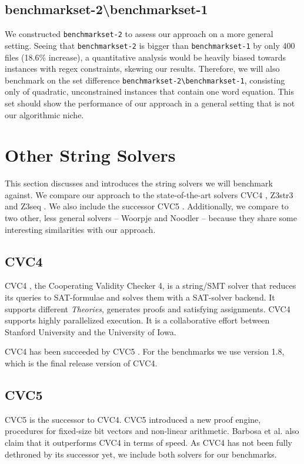 \subsection{benchmarkset-2\:\textbackslash\:benchmarkset-1}
We constructed \texttt{benchmarkset-2} to assess our approach on a more general setting. Seeing that \texttt{benchmarkset-2} is bigger than \texttt{benchmarkset-1} by only 400 files (18.6\% increase), a quantitative analysis would be heavily biased towards instances with regex constraints, skewing our results. Therefore, we will also benchmark on the set difference \texttt{benchmarkset-2\:\textbackslash\:benchmarkset-1}, consisting only of quadratic, unconstrained instances that contain one word equation. This set should show the performance of our approach in a general setting that is not our algorithmic niche.

\newpage

\section{Other String Solvers}
This section discusses and introduces the string solvers we will benchmark against. We compare our approach to the state-of-the-art \cite{zaligvinder} solvers CVC4 \cite{cvc4}, Z3str3 \cite{z3str3} and Z3seq \cite{z3}. We also include the successor CVC5 \cite{cvc5}. Additionally, we compare to two other, less general solvers -- Woorpje \cite{woorpje} and Noodler \cite{noodler} -- because they share some interesting similarities with our approach.

\subsection{CVC4}
CVC4 \cite{cvc4}, the Cooperating Validity Checker 4, is a string/SMT solver that reduces its queries to SAT-formulae and solves them with a SAT-solver backend. It supports different \textit{Theories}, generates proofs and satisfying assignments. CVC4 supports highly parallelized execution. It is a collaborative effort between Stanford University and the University of Iowa.

CVC4 has been succeeded by CVC5 \cite{cvc5}. For the benchmarks we use version 1.8, which is the final release version of CVC4.

\subsection{CVC5}
CVC5 \cite{cvc5} is the successor to CVC4. CVC5 introduced a new proof engine, procedures for fixed-size bit vectors and non-linear arithmetic. Barbosa et al. \cite{cvc5} also claim that it outperforms CVC4 in terms of speed. As CVC4 has not been fully dethroned by its successor yet, we include both solvers for our benchmarks.

